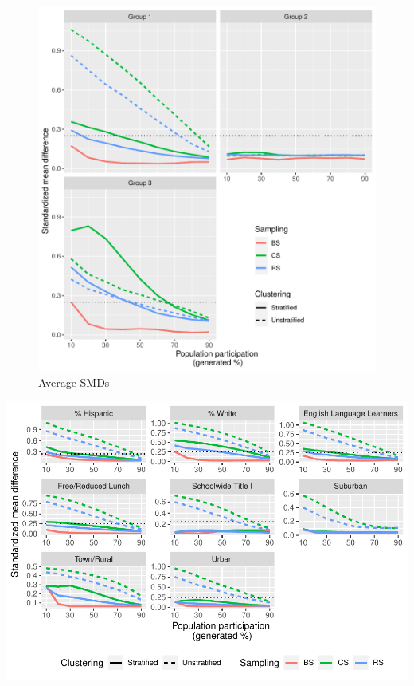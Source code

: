 \documentclass[
  english,
  man,floatsintext]{apa6}
\begin{document}
\begin{figure}
\centering
\includegraphics{5---Analysis_files/figure-latex/unnamed-chunk-14-1.pdf}
\caption{\label{fig:unnamed-chunk-14}Average SMDs}
\end{figure}

\includegraphics{5---Analysis_files/figure-latex/unnamed-chunk-15-1.pdf}
\end{document}
